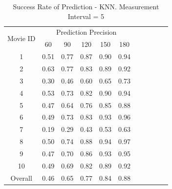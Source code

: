 \begin{table}[h!]
\begin{center}
\begin{tabular}{|c||c|c|c|c|c|c|c|c|c|c|}
\hline
\multirow{2}{*}{Movie ID} & \multicolumn{5}{c|}{Prediction Precision}	\\
\cline{2-6}
	& 60 & 90 & 120 & 150 & 180			\\
\hline
1	& 0.51	& 0.77	& 0.87	& 0.90	& 0.94		\\
2 	& 0.63	& 0.77	& 0.83	& 0.89	& 0.92		\\
3 	& 0.30	& 0.46	& 0.60	& 0.65	& 0.73		\\
4	& 0.53	& 0.73	& 0.82	& 0.90	& 0.94		\\
5	& 0.47	& 0.64	& 0.76	& 0.85	& 0.88		\\
6	& 0.49	& 0.73	& 0.83	& 0.93	& 0.96		\\
7 	& 0.19	& 0.29	& 0.43	& 0.53	& 0.63		\\
8 	& 0.50	& 0.74	& 0.88	& 0.94	& 0.97		\\
9 	& 0.47	& 0.70	& 0.86	& 0.93	& 0.95		\\
10 	& 0.49	& 0.69	& 0.82	& 0.89	& 0.92		\\	
\hline
\hline
Overall & 0.46	& 0.65	& 0.77	& 0.84	& 0.88	 	\\
\hline
\end{tabular}
\end{center}
\caption{Success Rate of Prediction - KNN. Measurement Interval = 5}
\label{tab:knn_interval5}
\end{table}




